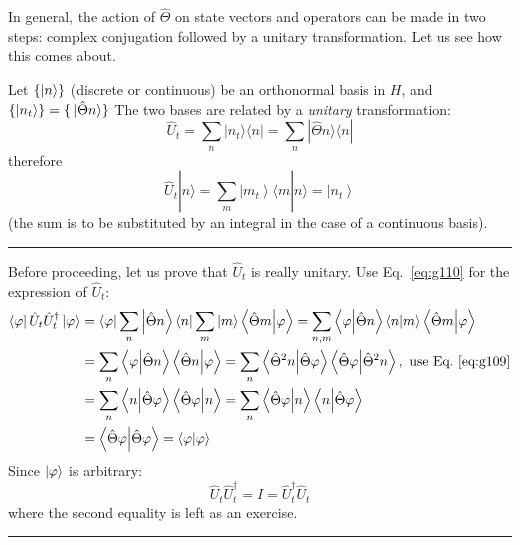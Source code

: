 \documentclass[12pt]{article}
\newcommand{\be}{\begin{equation}}
\newcommand{\ee}{\end{equation}}
\begin{document}
In general, the action of $\hat{\Theta}$ on state vectors and
operators can be made in two steps: complex conjugation
followed by a unitary transformation.
Let us see how this comes about.

Let $\{\ket{n}\}$ (discrete or continuous) be an orthonormal basis in $H$, and
$\{\ket{n_t}\} = \{\ket*{\hat{\Theta}n}\}$ The two bases are related by
a \emph{unitary} transformation:
\be
\hat{U}_{t}=\sum_{n}|n_{t}\rangle\langle n|=\sum_{n}| \hat{\Theta} n\rangle\langle n|
\label{eq:g110}
\ee
therefore
\be
\hat{U}_{t}|n\rangle=\sum_{m}\left|m_{t}\right\rangle\langle m | n\rangle=\left|n_{t}\right\rangle
\ee
(the sum is to be substituted by an integral in the case of a continuous basis).

\clearpage
\par\noindent\rule{\textwidth}{1pt}
Before proceeding, let us prove that $\hat{U}_t$ is really unitary.
Use Eq.~\eqref{eq:g110} for the expression of $\hat{U}_t$:
\be
\begin{aligned}
\bra{\varphi}\hat{U}_t\hat{U}_t^\dagger\ket{\varphi}
& = \bra{\varphi} \sum_n \ket{\hat{\Theta}n}\bra{n} \sum_m \ket{m}\bra{\hat{\Theta}m} \ket{\varphi}
 = \sum_{n,m} \bra{\varphi} \ket{\hat{\Theta}n} \bra{n}\ket{m} \bra{\hat{\Theta}m} \ket{\varphi}\\
& = \sum_{n} \bra{\varphi} \ket{\hat{\Theta}n} \bra{\hat{\Theta}n} \ket{\varphi}
 = \sum_{n} \bra{\hat{\Theta}^2 n} \ket{\hat{\Theta}\varphi} \bra{\hat{\Theta}\varphi} \ket{\hat{\Theta}^2 n},\text{ use Eq.~\eqref{eq:g109}} \\
& = \sum_{n} \bra{n} \ket{\hat{\Theta}\varphi} \bra{\hat{\Theta}\varphi} \ket{n}
 = \sum_{n} \bra{\hat{\Theta}\varphi} \ket{n}\bra{n} \ket{\hat{\Theta}\varphi}\\
& = \bra{\hat{\Theta}\varphi} \ket{\hat{\Theta}\varphi} = \bra{\varphi}\ket{\varphi}
\end{aligned}
\ee
Since $\ket{\varphi}$ is arbitrary:
\be
\hat{U}_t\hat{U}_t^\dagger = I = \hat{U}_t^\dagger\hat{U}_t
\ee
where the second equality is left as an exercise.

\par\noindent\rule{\textwidth}{1pt}
\end{document}
